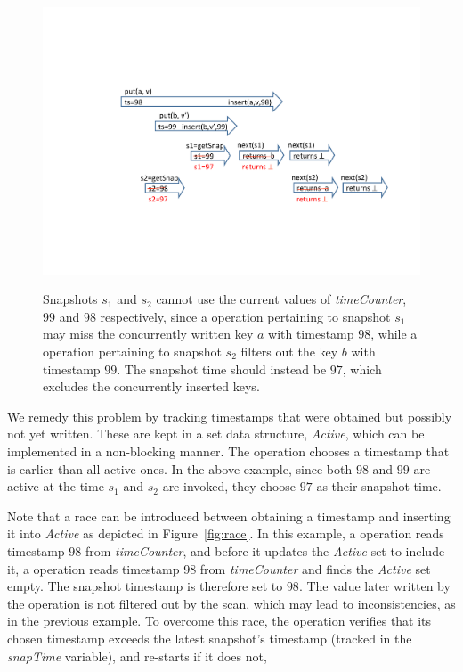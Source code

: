 \begin{figure}[t]
   		{\includegraphics[width=\columnwidth, clip, trim=150 150 50
 		170]{Figures/scanExample}}

		\caption{Snapshots $s_1$ and $s_2$ cannot use the current
		values of \emph{timeCounter}, $99$ and $98$ respectively, since a 
		operation pertaining to snapshot $s_1$ may miss the concurrently written key
		$a$ with timestamp $98$, while a 
		operation pertaining to snapshot $s_2$ filters out the key $b$ with timestamp $99$.
		The snapshot time should instead be $97$, which excludes the concurrently
		inserted keys.}
\label{fig:snap-ts}
\end{figure}

We remedy this problem by tracking timestamps that were obtained but
possibly not yet written. These are kept in a set data structure, \emph{Active}, which can
be implemented in a non-blocking manner. The 
operation chooses a timestamp that is earlier than all active ones.
In the above example, since both $98$ and $99$ are active at the time
$s_1$ and $s_2$ are invoked, they choose $97$ as their snapshot time.


Note that a race can be introduced between obtaining a timestamp and inserting
it into \emph{Active} as depicted in Figure~\ref{fig:race}. In this example, a
 operation reads timestamp $98$ from \emph{timeCounter}, and before
it updates the \emph{Active} set to include it, a
 operation reads timestamp $98$ from \emph{timeCounter} and finds
the \emph{Active} set empty. The snapshot timestamp is therefore set to $98$.
The value later written by the  operation is not filtered out by
the scan, which may lead to inconsistencies, as in the previous example.
%
To overcome this race, the  operation verifies that its chosen timestamp exceeds the latest snapshot's timestamp
(tracked in the \emph{snapTime} variable), and re-starts if it does not,

